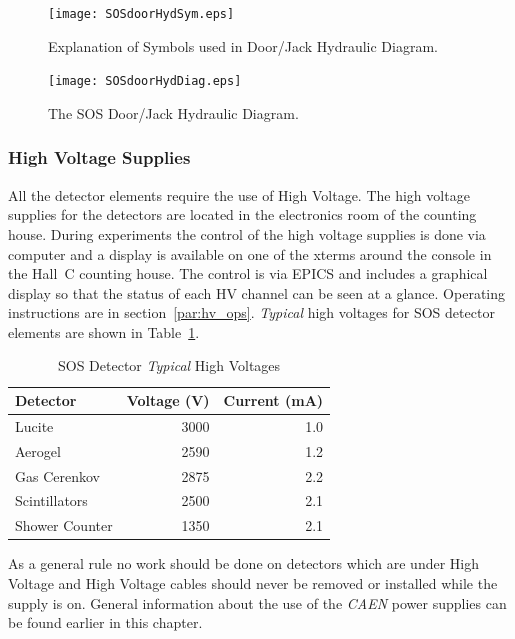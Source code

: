 \begin{figure}
\texttt{[image: SOSdoorHydSym.eps]}
\caption{Explanation of Symbols used in Door/Jack Hydraulic 
Diagram. \label{fig:SOSdoorHydSym}}
\end{figure}
\clearpage

\begin{figure}
\texttt{[image: SOSdoorHydDiag.eps]}
\caption{The SOS Door/Jack Hydraulic Diagram. \label{fig:SOSdoorHydDiag}}
\end{figure}
\clearpage


\subsubsection{High Voltage Supplies }

All the detector elements require the use of High Voltage. The
high voltage supplies for the detectors are located in the 
electronics room of the counting house.
During experiments the control of the high voltage supplies is done via
computer and a display is available on one of the xterms around
the console in the Hall~C counting house. The control is via
EPICS and includes a graphical display so that the status of each
HV channel can be seen at a glance. Operating instructions are
in section~\ref{par:hv_ops}. {\em Typical} high voltages for
SOS detector elements are shown in Table~\ref{tab:sos_hv}.

\begin{table}[!hbt]\centering
   \caption{SOS Detector {\em Typical} High Voltages\label{tab:sos_hv}}
   \begin{tabular}{lrr}
      Detector & Voltage (V) & Current (mA)\\
      \hline
      Lucite         & 3000  & 1.0 \\
      Aerogel        & 2590  & 1.2 \\
      Gas Cerenkov   & 2875  & 2.2 \\
      Scintillators  & 2500  & 2.1 \\
      Shower Counter & 1350  & 2.1 \\
      \hline
   \end{tabular}
\end{table}

As a general rule no work should be done on detectors which are under
High Voltage and
High Voltage cables should never be removed or installed while the supply is on.
General information about the use of the {\em CAEN} power supplies can be
found earlier in this chapter.


